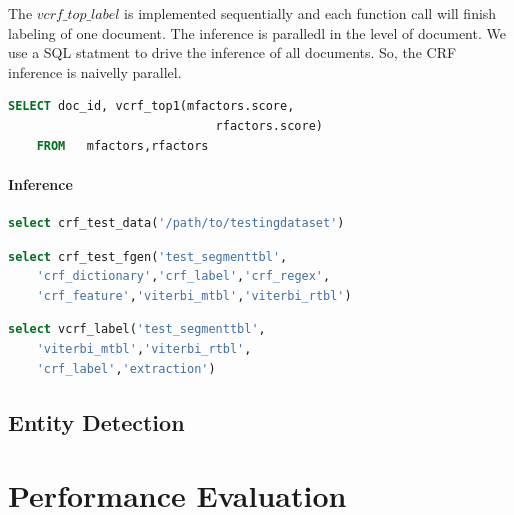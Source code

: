 \documentclass[11pt,letterpaper]{article}
\begin{document}
The $vcrf\_top\_label$ is implemented sequentially and each function call will finish labeling of one document. 
The inference is paralledl in the level of document. We use a SQL statment to drive the inference of all documents.
So, the CRF inference is naivelly parallel. 
\begin{lstlisting}[language=SQL,gobble=4]
    SELECT doc_id, vcrf_top1(mfactors.score, 
                             rfactors.score)
    FROM   mfactors,rfactors
\end{lstlisting}

\paragraph{Inference}
\begin{lstlisting}[language=SQL,gobble=4]
    select crf_test_data('/path/to/testingdataset')
\end{lstlisting}

\begin{lstlisting}[language=SQL,gobble=4]
    select crf_test_fgen('test_segmenttbl',
    'crf_dictionary','crf_label','crf_regex',
    'crf_feature','viterbi_mtbl','viterbi_rtbl')
\end{lstlisting}

\begin{lstlisting}[language=SQL,gobble=4]
    select vcrf_label('test_segmenttbl', 
    'viterbi_mtbl','viterbi_rtbl',
    'crf_label','extraction')
\end{lstlisting}

\cite{DBLP:conf/icml/LaffertyMP01}
\cite{DBLP:journals/scholarpedia/Viterbi09}
\cite{DBLP:journals/siamjo/MoralesN00}
\cite{DBLP:journals/coling/DeRose88}
\cite{DBLP:conf/naacl/ShaP03}
\cite{DBLP:journals/coling/MarcusSM94}



\subsection{Entity Detection}

\section{Performance Evaluation}
\label{sec:length}
\end{document}
